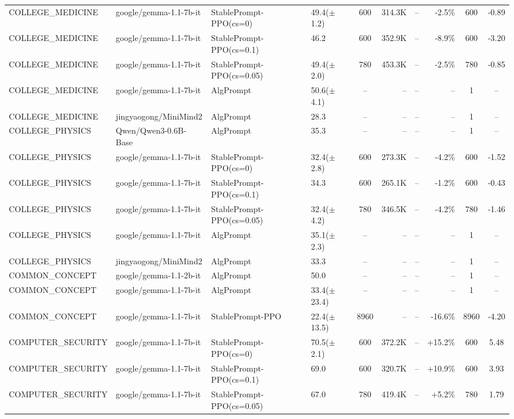 {\begin{longtable}{@{}p{5.5cm}p{4.5cm}p{2.5cm}lcrrrcc@{}}
\midrule
COLLEGE\_MEDICINE & google/gemma-1.1-7b-it & StablePrompt-PPO(cs=0) & 49.4($\pm$1.2) & 600 & 314.3K & -- & -2.5\% & 600 & -0.89 \\
COLLEGE\_MEDICINE & google/gemma-1.1-7b-it & StablePrompt-PPO(cs=0.1) & 46.2 & 600 & 352.9K & -- & -8.9\% & 600 & -3.20 \\
COLLEGE\_MEDICINE & google/gemma-1.1-7b-it & StablePrompt-PPO(cs=0.05) & 49.4($\pm$2.0) & 780 & 453.3K & -- & -2.5\% & 780 & -0.85 \\
COLLEGE\_MEDICINE & google/gemma-1.1-7b-it & AlgPrompt & 50.6($\pm$4.1) & -- & -- & -- & -- & 1 & -- \\
\midrule
COLLEGE\_MEDICINE & jingyaogong/MiniMind2 & AlgPrompt & 28.3 & -- & -- & -- & -- & 1 & -- \\
\midrule
COLLEGE\_PHYSICS & Qwen/Qwen3-0.6B-Base & AlgPrompt & 35.3 & -- & -- & -- & -- & 1 & -- \\
\midrule
COLLEGE\_PHYSICS & google/gemma-1.1-7b-it & StablePrompt-PPO(cs=0) & 32.4($\pm$2.8) & 600 & 273.3K & -- & -4.2\% & 600 & -1.52 \\
COLLEGE\_PHYSICS & google/gemma-1.1-7b-it & StablePrompt-PPO(cs=0.1) & 34.3 & 600 & 265.1K & -- & -1.2\% & 600 & -0.43 \\
COLLEGE\_PHYSICS & google/gemma-1.1-7b-it & StablePrompt-PPO(cs=0.05) & 32.4($\pm$4.2) & 780 & 346.5K & -- & -4.2\% & 780 & -1.46 \\
COLLEGE\_PHYSICS & google/gemma-1.1-7b-it & AlgPrompt & 35.1($\pm$2.3) & -- & -- & -- & -- & 1 & -- \\
\midrule
COLLEGE\_PHYSICS & jingyaogong/MiniMind2 & AlgPrompt & 33.3 & -- & -- & -- & -- & 1 & -- \\
\midrule
COMMON\_CONCEPT & google/gemma-1.1-2b-it & AlgPrompt & 50.0 & -- & -- & -- & -- & 1 & -- \\
\midrule
COMMON\_CONCEPT & google/gemma-1.1-7b-it & AlgPrompt & 33.4($\pm$23.4) & -- & -- & -- & -- & 1 & -- \\
COMMON\_CONCEPT & google/gemma-1.1-7b-it & StablePrompt-PPO & 22.4($\pm$13.5) & 8960 & -- & -- & -16.6\% & 8960 & -4.20 \\
\midrule
COMPUTER\_SECURITY & google/gemma-1.1-7b-it & StablePrompt-PPO(cs=0) & 70.5($\pm$2.1) & 600 & 372.2K & -- & +15.2\% & 600 & 5.48 \\
COMPUTER\_SECURITY & google/gemma-1.1-7b-it & StablePrompt-PPO(cs=0.1) & 69.0 & 600 & 320.7K & -- & +10.9\% & 600 & 3.93 \\
COMPUTER\_SECURITY & google/gemma-1.1-7b-it & StablePrompt-PPO(cs=0.05) & 67.0 & 780 & 419.4K & -- & +5.2\% & 780 & 1.79 \\

\end{longtable}}
